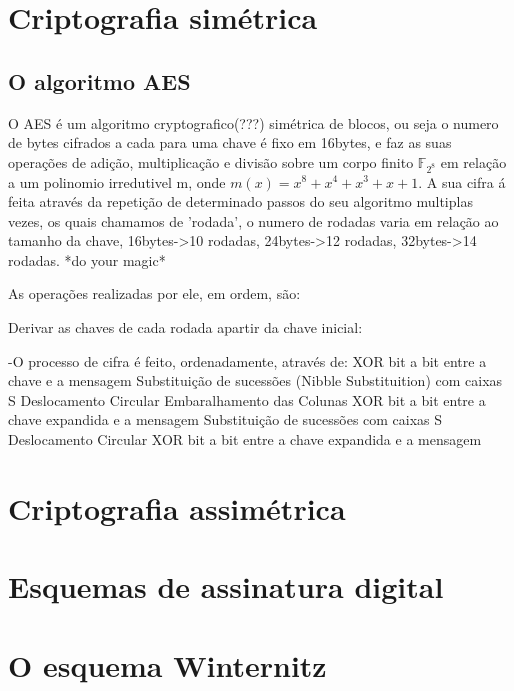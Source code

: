 \documentclass{article}
\begin{document}

\section*{Criptografia simétrica}

\subsection*{O algoritmo AES}

O AES é um algoritmo cryptografico(???) simétrica de blocos, ou seja o numero de bytes cifrados a cada para uma chave é fixo em 16bytes, e faz as suas operações de adição, multiplicação e divisão sobre um corpo finito $\mathbb{F}_{2^{8}}$ em relação a um polinomio irredutivel m, onde $m(x) = x^{8} + x^{4} + x^{3} + x + 1$. 
A sua cifra á feita através da repetição de determinado passos do seu algoritmo multiplas vezes, os quais chamamos de 'rodada', o numero de rodadas varia em relação ao tamanho da chave, 16bytes->10 rodadas, 24bytes->12 rodadas, 32bytes->14 rodadas. *do your magic*


As operações realizadas por ele, em ordem, são:

\begin{itemize}
Derivar as chaves de cada rodada apartir da chave inicial: 


\end{itemize}
-O processo de cifra é feito, ordenadamente, através de: 
XOR bit a bit entre a chave e a mensagem
Substituição de sucessões (Nibble Substituition) com caixas S
Deslocamento Circular
Embaralhamento das Colunas
XOR bit a bit entre a chave expandida e a mensagem
Substituição de sucessões com caixas S
Deslocamento Circular
XOR bit a bit entre a chave expandida e a mensagem


\section*{Criptografia assimétrica}

\section*{Esquemas de assinatura digital}

\section*{O esquema Winternitz}
\end{document}
